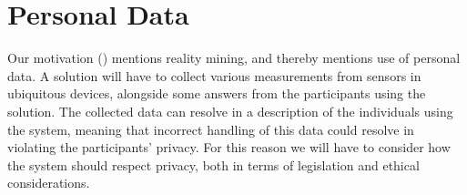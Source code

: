 
\section{Personal Data}
\label{sec:personal_data}

Our motivation () mentions reality mining, and thereby mentions use of personal data. A solution will have to collect various measurements from sensors in ubiquitous devices, alongside some answers from the participants using the solution. The collected data can resolve in a description of the individuals using the system, meaning that incorrect handling of this data could resolve in violating the participants' privacy. For this reason we will have to consider how the system should respect privacy, both in terms of legislation and ethical considerations.



